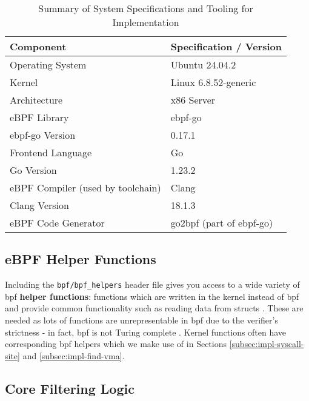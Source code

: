 \begin{table}[h] %
\centering
\caption{Summary of System Specifications and Tooling for \af Implementation}
\label{tab:specs_tooling}
\begin{tabular}{ll}
\toprule %
\textbf{Component} & \textbf{Specification / Version} \\
\midrule %
Operating System      & Ubuntu 24.04.2 \\
Kernel                & Linux 6.8.52-generic \\
Architecture          & x86 Server \\
eBPF Library          & ebpf-go \\
ebpf-go Version       & 0.17.1 \\
Frontend Language     & Go \\
Go Version            & 1.23.2 \\
eBPF Compiler (used by toolchain) & Clang \\
Clang Version         & 18.1.3 \\
eBPF Code Generator   & go2bpf (part of ebpf-go) \\
\bottomrule %
\end{tabular}
\end{table}

\subsection{eBPF Helper Functions}

Including the \texttt{bpf/bpf\_helpers} header file gives you access to a wide
variety of \ac{bpf} \textbf{helper functions}: functions which are written in
the kernel instead of \ac{bpf} and provide common functionality such as reading
data from structs \cite{ebpf-helper-functions-2025, ebpf-bpf-probe-read-user-2024}. 
These are needed as lots of functions are unrepresentable in 
\ac{bpf} due to the verifier's strictness - in fact, \ac{bpf} is not Turing
complete \cite{gregg-bpf-performance-tools-2019}. Kernel functions often have
corresponding \ac{bpf} helpers which we make use of in Sections
\ref{subsec:impl-syscall-site} and \ref{subsec:impl-find-vma}.

\subsection{Core Filtering Logic}

